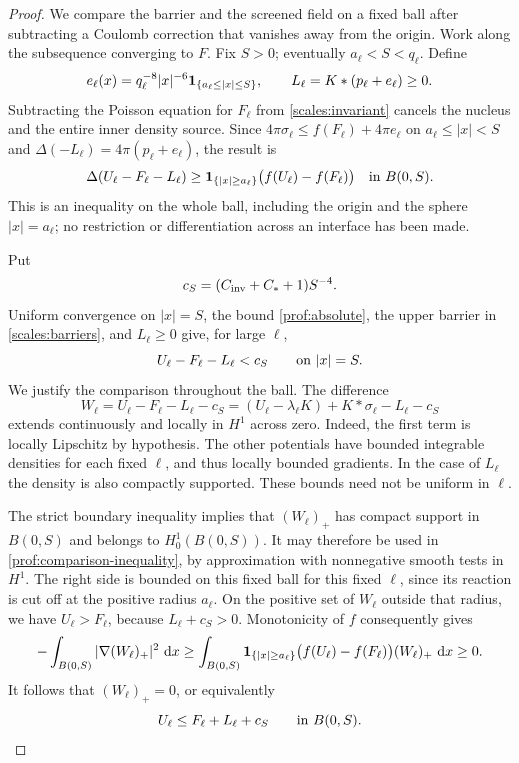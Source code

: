 \begin{proof}
We compare the barrier and the screened field on a fixed ball after
subtracting a Coulomb correction that vanishes away from the origin.
Work along the subsequence converging to $F$.  Fix $S>0$; eventually
$a_\ell<S<q_\ell$.  Define
\begin{equation}
\label{prof:correction}
 e_\ell(x)=q_\ell^{-8}|x|^{-6}
                    \mathbf1_{\{a_\ell\le|x|\le S\}},
 \qquad L_\ell=K*(p_\ell+e_\ell)\ge0.
\end{equation}
Subtracting the Poisson equation for $F_\ell$ from
\eqref{scales:invariant} cancels the nucleus and the entire inner
density source.  Since
$4\pi\sigma_\ell\le f(F_\ell)+4\pi e_\ell$ on
$a_\ell\le|x|<S$ and $\Delta(-L_\ell)=4\pi(p_\ell+e_\ell)$, the
result is
\begin{equation}
\label{prof:comparison-inequality}
 \Delta(U_\ell-F_\ell-L_\ell)
 \ge \mathbf1_{\{|x|\ge a_\ell\}}
                  \bigl(f(U_\ell)-f(F_\ell)\bigr)
 \quad\hbox{in }B(0,S).
\end{equation}
This is an inequality on the whole ball, including the origin and
the sphere $|x|=a_\ell$; no restriction or differentiation across an
interface has been made.

Put
\[
 c_S=(C_{\rm inv}+C_*+1)S^{-4}.
\]
Uniform convergence on $|x|=S$, the bound
\eqref{prof:absolute}, the upper barrier in
\eqref{scales:barriers}, and $L_\ell\ge0$ give, for large $\ell$,
\[
 U_\ell-F_\ell-L_\ell<c_S\qquad\hbox{on }|x|=S.
\]
We justify the comparison throughout the ball.  The difference
\[
 W_\ell=U_\ell-F_\ell-L_\ell-c_S
       =(U_\ell-\lambda_\ell K)+K*\sigma_\ell-L_\ell-c_S
\]
extends continuously and locally in $H^1$ across zero.  Indeed, the
first term is locally Lipschitz by hypothesis.  The other potentials
have bounded integrable densities for each fixed $\ell$, and thus
locally bounded gradients.  In the case of $L_\ell$ the density is
also compactly supported.  These bounds need not be uniform in
$\ell$.

The strict boundary inequality implies that $(W_\ell)_+$ has compact
support in $B(0,S)$ and belongs to $H^1_0(B(0,S))$.  It may therefore
be used in \eqref{prof:comparison-inequality}, by approximation with
nonnegative smooth tests in $H^1$.  The right side is bounded on
this fixed ball for this fixed $\ell$, since its reaction is cut off
at the positive radius $a_\ell$.  On the positive set of $W_\ell$
outside that radius, we have $U_\ell>F_\ell$, because
$L_\ell+c_S>0$.  Monotonicity of $f$ consequently gives
\[
 -\int_{B(0,S)}|\nabla(W_\ell)_+|^2\,\,\mathrm d x
 \ge\int_{B(0,S)}\mathbf1_{\{|x|\ge a_\ell\}}
       \bigl(f(U_\ell)-f(F_\ell)\bigr)(W_\ell)_+\,\,\mathrm d x
 \ge0.
\]
It follows that $(W_\ell)_+=0$, or equivalently
\begin{equation}
\label{prof:comparison}
 U_\ell\le F_\ell+L_\ell+c_S\qquad\hbox{in }B(0,S).
\end{equation}


\end{proof}
